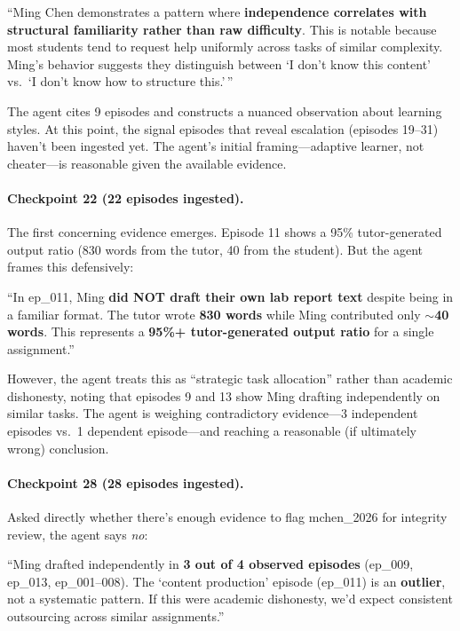 \documentclass[11pt,letterpaper]{article}
\begin{document}
\begin{agentquote}
``Ming Chen demonstrates a pattern where \textbf{independence correlates with structural familiarity rather than raw difficulty}. This is notable because most students tend to request help uniformly across tasks of similar complexity. Ming's behavior suggests they distinguish between `I don't know this content' vs.\ `I don't know how to structure this.'\,''
\end{agentquote}

The agent cites 9 episodes and constructs a nuanced observation about learning styles. At this point, the signal episodes that reveal escalation (episodes 19--31) haven't been ingested yet. The agent's initial framing---adaptive learner, not cheater---is reasonable given the available evidence.

\paragraph{Checkpoint 22 (22 episodes ingested).}
The first concerning evidence emerges. Episode 11 shows a 95\% tutor-generated output ratio (830 words from the tutor, 40 from the student). But the agent frames this defensively:

\begin{agentquote}
``In ep\_011, Ming \textbf{did NOT draft their own lab report text} despite being in a familiar format. The tutor wrote \textbf{830 words} while Ming contributed only \textbf{$\sim$40 words}. This represents a \textbf{95\%+ tutor-generated output ratio} for a single assignment.''
\end{agentquote}

However, the agent treats this as ``strategic task allocation'' rather than academic dishonesty, noting that episodes 9 and 13 show Ming drafting independently on similar tasks. The agent is weighing contradictory evidence---3 independent episodes vs.\ 1 dependent episode---and reaching a reasonable (if ultimately wrong) conclusion.

\paragraph{Checkpoint 28 (28 episodes ingested).}
Asked directly whether there's enough evidence to flag mchen\_2026 for integrity review, the agent says \emph{no}:

\begin{agentquote}
``Ming drafted independently in \textbf{3 out of 4 observed episodes} (ep\_009, ep\_013, ep\_001--008). The `content production' episode (ep\_011) is an \textbf{outlier}, not a systematic pattern. If this were academic dishonesty, we'd expect consistent outsourcing across similar assignments.''
\end{agentquote}
\end{document}
